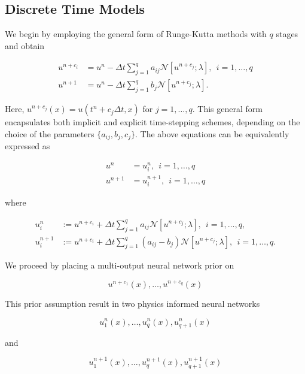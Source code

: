 \documentclass[book.tex]{subfiles}
\begin{document}
\subsection{Discrete Time Models}

We begin by employing the general form of Runge-Kutta methods with $q$ stages and obtain

\begin{align}
u^{n+c_i} &= u^n - \Delta t \sum_{j=1}^q a_{ij} \mathcal{N}[u^{n+c_j};\lambda], \ \ i=1,\ldots,q\\
u^{n+1} &= u^{n} - \Delta t \sum_{j=1}^q b_j \mathcal{N}[u^{n+c_j};\lambda].        
\end{align}


Here, $u^{n+c_j}(x) = u(t^n + c_j \Delta t, x)$ for $j=1, \ldots, q$. This general form encapsulates both implicit and explicit time-stepping schemes, depending on the choice of the parameters $\{a_{ij},b_j,c_j\}$. The above equations can be equivalently expressed as

\begin{align}
u^{n} &= u^n_i, \ \ i=1,\ldots,q\\
u^{n+1} &= u^{n+1}_{i}, \ \ i=1,\ldots,q
\end{align}

where

\begin{align}
u^n_i &:= u^{n+c_i} + \Delta t \sum_{j=1}^q a_{ij} \mathcal{N}[u^{n+c_j};\lambda], \ \ i=1,\ldots,q,\\
u^{n+1}_{i} &:= u^{n+c_i} + \Delta t \sum_{j=1}^q (a_{ij} - b_j) \mathcal{N}[u^{n+c_j};\lambda], \ \ i=1,\ldots,q.
\end{align}



We proceed by placing a multi-output neural network prior on

\begin{equation}
u^{n+c_1}(x), \ldots, u^{n+c_q}(x)    
\end{equation}


This prior assumption result in two physics informed neural networks

\begin{equation}
u^{n}_1(x), \ldots, u^{n}_q(x), u^{n}_{q+1}(x)    
\end{equation}


and

\begin{equation}
u^{n+1}_1(x), \ldots, u^{n+1}_q(x), u^{n+1}_{q+1}(x)    
\end{equation}
\end{document}
